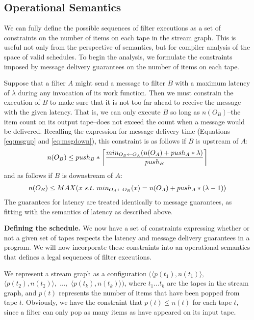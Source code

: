 \subsection{Operational Semantics}

We can fully define the possible sequences of filter executions as a
set of constraints on the number of items on each tape in the stream
graph.  This is useful not only from the perspective of semantics, but
for compiler analysis of the space of valid schedules.  To begin the
analysis, we formulate the constraints imposed by message delivery
guarantees on the number of items on each tape.

Suppose that a filter $A$ might send a message to filter $B$ with a
maximum latency of $\lambda$ during any invocation of its work
function.  Then we must constrain the execution of $B$ to make sure
that it is not too far ahead to receive the message with the given
latency.  That is, we can only execute $B$ so long as $n(O_B)$--the
item count on its output tape--does not exceed the count when a
message would be delivered.  Recalling the expression for message
delivery time (Equations \ref{eq:msgup} and \ref{eq:msgdown}), this
constraint is as follows if $B$ is upstream of $A$:
\begin{align}
\label{eq:mc1}
n(O_B) \le push_B * \left\lceil\frac{min_{O_B \leftarrow O_A}(n(O_A) + push_A * \lambda)}{push_B}\right\rceil
\end{align}
and as follows if $B$ is downstream of $A$:
\begin{align}
\label{eq:mc2}
n(O_B) \le MAX(x~s.t.~min_{O_A \leftarrow O_B}(x) = n(O_A) + push_A * (\lambda-1))
\end{align}
The guarantees for latency are treated identically to message
guarantees, as fitting with the semantics of latency as described
above.

{\bf Defining the schedule.}  We now have a set of constraints
expressing whether or not a given set of tapes respects the latency
and message delivery guarantees in a program.  We will now
incorporate these constraints into an operational semantics that
defines a legal sequences of filter executions.

We represent a stream graph as a configuration $(\langle p(t_1),
n(t_1) \rangle,$ $\langle p(t_2), n(t_2) \rangle,$ $\dots,$ $\langle
p(t_k), n(t_k) \rangle)$, where $t_1 \dots t_k$ are the tapes in the
stream graph, and $p(t)$ represents the number of items that have been
popped from tape $t$.  Obviously, we have the constraint that $p(t)
\le n(t)$ for each tape $t$, since a filter can only pop as many items
as have appeared on its input tape.

